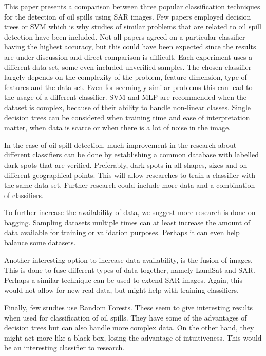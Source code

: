 This paper presents a comparison between three popular classification techniques for the detection of oil spills using SAR images. Few papers employed decision trees or SVM which is why studies of similar problems that are related to oil spill detection have been included. Not all papers agreed on a particular classifier having the highest accuracy, but this could have been expected since the results are under discussion and direct comparison is difficult. Each experiment uses a different data set, some even included unverified samples. The chosen classifier largely depends on the complexity of the problem, feature dimension, type of features and the data set. Even for seemingly similar problems this can lead to the usage of a different classifier. SVM and MLP are recommended when the dataset is complex, because of their ability to handle non-linear classes. Single decision trees can be considered when training time and ease of interpretation matter, when data is scarce or when there is a lot of noise in the image. 

In the case of oil spill detection, much improvement in the research about different classifiers can be done by establishing a common database with labelled dark spots that are verified. Preferably, dark spots in all shapes, sizes and on different geographical points. This will allow researches to train a classifier with the same data set. Further research could include more data and a combination of classifiers.

To further increase the availability of data, we suggest more research is done on bagging. Sampling datasets multiple times can at least increase the amount of data available for training or validation purposes. Perhaps it can even help balance some datasets.

Another interesting option to increase data availability, is the fusion of images. This is done to fuse different types of data together, namely LandSat and SAR. Perhaps a similar technique can be used to extend SAR images. Again, this would not allow for new real data, but might help with training classifiers.

Finally, few studies use Random Forests. These seem to give interesting results when used for classification of oil spills. They have some of the advantages of decision trees but can also handle more complex data. On the other hand, they might act more like a black box, losing the advantage of intuitiveness. This would be an interesting classifier to research.